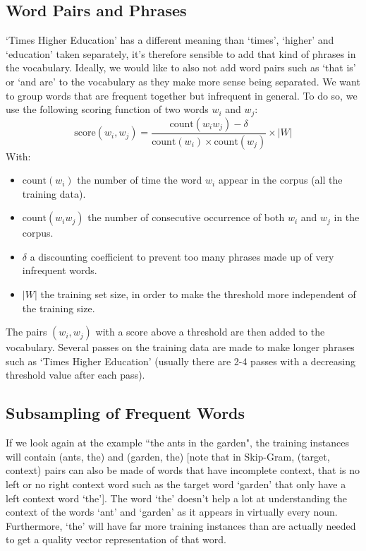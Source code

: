 \subsection{Word Pairs and Phrases}
`Times Higher Education' has a different meaning than `times', `higher' and `education' taken separately, it's therefore sensible to add that kind of phrases in the vocabulary. Ideally, we would like to also not add word pairs such as `that is' or `and are' to the vocabulary as they make more sense being separated. We want to group words that are frequent together but infrequent in general. To do so, we use the following scoring function of two words $w_i$ and $w_j$:
\begin{equation}
    \text{score}(w_i, w_j) = \frac{\text{count}(w_iw_j) - \delta}{\text{count}(w_i)\times \text{count}(w_j)}\times |W|
\end{equation}
With: 
\begin{itemize}[topsep=0pt]
    \item $\text{count}(w_i)$ the number of time the word $w_i$ appear in the corpus (all the training data).
    \item $\text{count}(w_iw_j)$ the number of consecutive occurrence of both $w_i$ and $w_j$ in the corpus. 
    \item $\delta$ a discounting coefficient to prevent too many phrases made up of very infrequent words.
    \item $|W|$ the training set size, in order to make the threshold more independent of the training size.
\end{itemize}

The pairs $(w_i, w_j)$ with a score above a threshold are then added to the vocabulary. Several passes on the training data are made to make longer phrases such as `Times Higher Education' (usually there are 2-4 passes with a decreasing threshold value after each pass).

\subsection{Subsampling of Frequent Words}
If we look again at the example ``the ants in the garden", the training instances will contain (ants, the) and (garden, the) [note that in Skip-Gram, (target, context) pairs can also be made of words that have incomplete context, that is no left or no right context word such as the target word `garden' that only have a left context word `the']. The word `the' doesn't help a lot at understanding the context of the words `ant' and `garden' as it appears in virtually every noun. Furthermore, `the' will have far more training instances than are actually needed to get a quality vector representation of that word.

